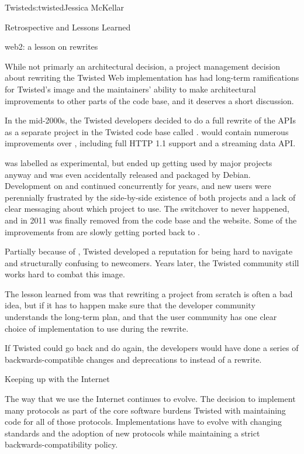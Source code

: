 \begin{aosachapter}{Twisted}{s:twisted}{Jessica McKellar}
\begin{aosasect1}{Retrospective and Lessons Learned}
\begin{aosasect2}{web2: a lesson on rewrites}

While not primarly an architectural decision, a project management decision
about rewriting the Twisted Web implementation has had long-term ramifications
for Twisted's image and the maintainers' ability to make architectural
improvements to other parts of the code base, and it deserves a short
discussion.

In the mid-2000s, the Twisted developers decided to do a full rewrite of the
 APIs as a separate project in the Twisted code base
called .  would contain numerous improvements
over , including full HTTP 1.1 support and a streaming
data API.

 was labelled as experimental, but ended up getting used by
major projects anyway and was even accidentally released and packaged by
Debian. Development on  and  continued
concurrently for years, and new users were perennially frustrated by the
side-by-side existence of both projects and a lack of clear messaging about
which project to use. The switchover to  never happened, and in
2011  was finally removed from the code base and the
website. Some of the improvements from  are slowly getting
ported back to .

Partially because of , Twisted developed a reputation for
being hard to navigate and structurally confusing to newcomers. Years later, the
Twisted community still works hard to combat this image.

The lesson learned from  was that rewriting a project from
scratch is often a bad idea, but if it has to happen make sure that the
developer community understands the long-term plan, and that the user community
has one clear choice of implementation to use during the rewrite.

If Twisted could go back and do  again, the developers would
have done a series of backwards-compatible changes and deprecations to
 instead of a rewrite.

\end{aosasect2}

\begin{aosasect2}{Keeping up with the Internet}

The way that we use the Internet continues to evolve. The decision to
implement many protocols as part of the core software burdens Twisted with
maintaining code for all of those protocols.  Implementations have to evolve
with changing standards and the adoption of new protocols while maintaining a
strict backwards-compatibility policy.


\end{aosasect2}
\end{aosasect1}
\end{aosachapter}
